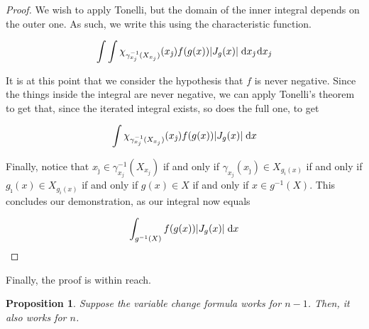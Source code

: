 \documentclass[11pt]{article}
\theoremstyle{definition}
\theoremstyle{plain}
\newtheorem{prop}{Proposition}
\newcommand{\mo}{^{-1}}
\begin{document}
\begin{proof}
We wish to apply Tonelli, but the domain of the inner integral depends on the outer one. As such, we write this using the characteristic function.

\[ \int \int \chi_{\gamma_{x_j}\mo(X_{x_j})}(x_{\hat\jmath}) f(g(x)) \lvert J_g(x) \rvert \d{x_{\hat\jmath}} \d{x_j} \]

It is at this point that we consider the hypothesis that $f$ is never negative. Since the things inside the integral are never negative, we can apply Tonelli's theorem to get that, since the iterated integral exists, so does the full one, to get

\[ \int \chi_{\gamma_{x_j}\mo(X_{x_j})}(x_{\hat\jmath}) f(g(x)) \lvert J_g(x) \rvert \d{x} \]

Finally, notice that $x_{\hat\jmath} \in \gamma_{x_j}\mo(X_{x_j})$ if and only if $\gamma_{x_j}(x_{\hat\jmath}) \in X_{g_i(x)}$ if and only if $g_{\hat\imath}(x) \in X_{g_i(x)}$ if and only if $g(x) \in X$ if and only if $x \in g\mo(X)$. This concludes our demonstration, as our integral now equals

\[ \int_{g\mo(X)} f(g(x)) \lvert J_g(x) \rvert \d{x} \]
\end{proof}

Finally, the proof is within reach.

\begin{prop}
Suppose the variable change formula works for $n-1$. Then, it also works for $n$.
\end{prop}
\end{document}
